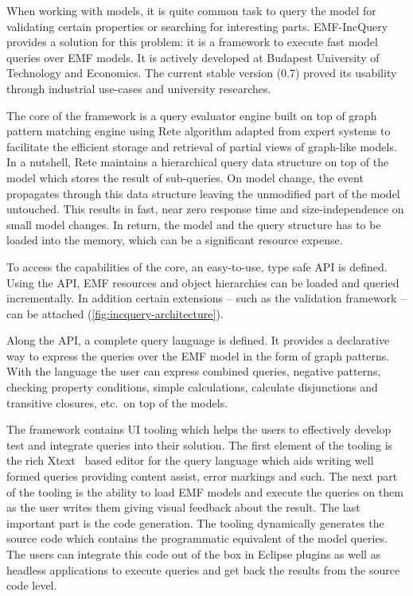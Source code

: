  
\cite{icmt2011} 

When working with models, it is quite common task to query the model for validating certain properties or searching for interesting parts. EMF-IncQuery \cite{EMFIncQuery} provides a solution for this problem: it is a framework to execute fast model queries over EMF models. It is actively developed at Budapest University of Technology and Economics. The current stable version (0.7) proved its usability through industrial use-cases and university researches.

The core of the framework is a query evaluator engine built on top of graph pattern matching engine using Rete algorithm adapted from expert systems to facilitate the efficient storage and retrieval of partial views of graph-like models. In a nutshell, Rete maintains a hierarchical query data structure on top of the model which stores the result of sub-queries. On model change, the event propagates through this data structure leaving the unmodified part of the model untouched. This results in fast, near zero response time and size-independence on small model changes. In return, the model and the query structure has to be loaded into the memory, which can be a significant resource expense.

To access the capabilities of the core, an easy-to-use, type safe API is defined. Using the API, EMF resources and object hierarchies can be loaded and queried incrementally. In addition certain extensions -- such as the validation
framework -- can be attached (\autoref{fig:incquery-architecture}). 

Along the API, a complete query language is defined. It provides a declarative way to express the queries over the EMF model in the form of graph patterns. With the language the user can express combined queries, negative patterns, checking property conditions, simple calculations, calculate disjunctions and transitive closures, etc.~on top of the models.

The framework contains UI tooling which helps the users to effectively develop test and integrate queries into their solution. The first element of the tooling is the rich Xtext~\cite{XtextWeb} based editor for the query language which aids writing well formed queries providing content assist, error markings and such. The next part of the tooling is the ability to load EMF models and execute the queries on them as the user writes them giving visual feedback about the result. The last important part is the code generation. The tooling dynamically generates the source code which contains the programmatic equivalent of the model queries. The users can integrate this code out of the box in Eclipse
plugins as well as headless applications to execute queries and get back the results from the source code level.


